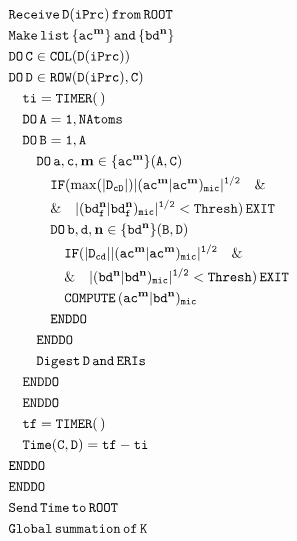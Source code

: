 \documentclass[prl,preprint,doublespace]{revtex4} %
\begin{document}
{\begin{figure}[h]
\begin{center}
  \begin{equation*}
    \begin{split}
      &\tt        Receive\,D(iPrc)\,from\,ROOT\\
      &\tt        Make\,list\,\{ac^\mathbf{m}\}\,and\,\{bd^\mathbf{n}\} \\
      &\tt        DO\,C\in COL(D(iPrc)) \\
      &\tt        DO\,D\in ROW(D(iPrc),C) \\
      &\tt\quad     ti=TIMER(\,) \\
      &\tt\quad     DO\,A=1,NAtoms \\
      &\tt\quad     DO\,B=1,A \\
      &\tt\qquad      DO\,a,c,\mathbf{m}\in\{ac^\mathbf{m}\}(A,C) \\
      &\tt\qquad\quad   IF(\max(|D_{cD}|)|(ac^\mathbf{m}|ac^\mathbf{m})_{mic}|^{1/2}\quad\&\\
      &\tt\qquad\quad    \&\quad|(bd_f^\mathbf{n}|bd_f^\mathbf{n})_{mic}|^{1/2}<Thresh)\,EXIT  \\
      &\tt\qquad\quad   DO\,b,d,\mathbf{n}\in\{bd^\mathbf{n}\}(B,D) \\
      &\tt\qquad\qquad    IF(|D_{cd}||(ac^\mathbf{m}|ac^\mathbf{m})_{mic}|^{1/2}\quad\&\\
      &\tt\qquad\qquad    \&\quad|(bd^\mathbf{n}|bd^\mathbf{n})_{mic}|^{1/2}<Thresh)\,EXIT  \\
      &\tt\qquad\qquad    COMPUTE\,(ac^\mathbf{m}|bd^\mathbf{n})_{mic} \\
      &\tt\qquad\quad   ENDDO \\
      &\tt\qquad      ENDDO \\
      &\tt\qquad      Digest\,D\,and\,ERIs \\
      &\tt\quad     ENDDO \\
      &\tt\quad     ENDDO \\
      &\tt\quad     tf=TIMER(\,) \\
      &\tt\quad     Time(C,D)=tf-ti \\
      &\tt        ENDDO \\
      &\tt        ENDDO \\
      &\tt        Send\,Time\,to\,ROOT \\
      &\tt        Global\,summation\,of\,K
    \end{split}
  \end{equation*}
\end{center}


\end{figure}}
\end{document}
